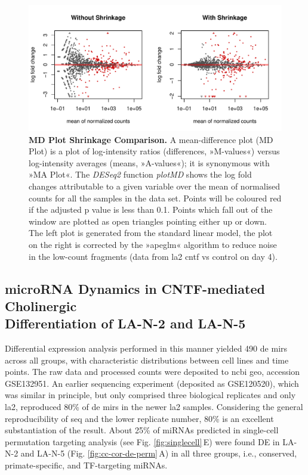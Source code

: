 \begin{figure}[ht]
\centering
\includegraphics[width=\textwidth]{figures/apeglm-comp-la2d4}
\caption[MD Plot Shrinkage Comparison.]{\textbf{MD Plot Shrinkage Comparison.} A mean-difference plot (MD Plot) is a plot of log-intensity ratios (differences, »M-values«) versus log-intensity averages (means, »A-values«); it is synonymous with »MA Plot«. The \textit{DESeq2} function \textit{plotMD} shows the log fold changes attributable to a given variable over the mean of normalised counts for all the samples in the data set. Points will be coloured red if the adjusted p value is less than 0.1. Points which fall out of the window are plotted as open triangles pointing either up or down. The left plot is generated from the standard linear model, the plot on the right is corrected by the »apeglm« algorithm\cite{Zhu2019} to reduce noise in the low-count fragments (data from \ac{la2} \ac{cntf} vs control on day 4).
\label{fig:apeglm-comp-la2d4}}
\end{figure}

\subsection{microRNA Dynamics in CNTF-mediated Cholinergic\\ Differentiation of LA-N-2 and LA-N-5} \label{sec:cellculture:de}
Differential expression analysis performed in this manner yielded 490 \ac{de} \acp{mir} across all groups, with characteristic distributions between cell lines and time points. The raw data and processed counts were deposited to \ac{ncbi} \ac{geo}, accession GSE132951. An earlier sequencing experiment (deposited as GSE120520), which was similar in principle, but only comprised three biological replicates and only \ac{la2}, reproduced 80\% of \ac{de} \acp{mir} in the newer \ac{la2} samples. Considering the general reproducibility of \ac{seq} and the lower replicate number, 80\% is an excellent substantiation of the result. About 25\% of miRNAs predicted in single-cell permutation targeting analysis (see Fig. \ref{fig:singlecell}\,E) were found DE in LA-N-2 and LA-N-5 (Fig. \ref{fig:cc-cor-de-perm}\,A) in all three groups, i.e., conserved, primate-specific, and TF-targeting miRNAs.  

